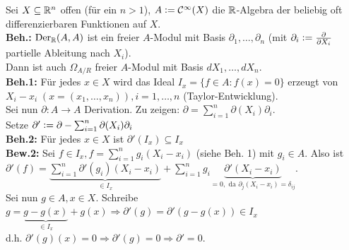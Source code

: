 \documentclass[a4paper, 10pt]{report}
\begin{document}
\begin{nnBsp}
  Sei $X \subseteq \mathbb{R}^n$ offen (für ein $n>1$), $A \mathrel{\mathop:}=
  \mathcal{C}^{\infty}(X)$ die $\mathbb{R}$-Algebra der beliebig oft
  differenzierbaren Funktionen auf $X$.\\
  \textbf{Beh.:} $\Der[{\RR}]{A}{A}$ ist ein freier $A$-Modul mit
  Basis $\partial_1, \dots , \partial_n$ (mit $\partial_i \mathrel{\mathop:}= 
  \frac{\partial}{\partial X_i}$ partielle Ableitung nach $X_i$).\\
  Dann ist auch $\Omega_{A/R}$ freier $A$-Modul mit Basis $d X_1, \dots , d
  X_n$.\\
  \textbf{Beh.1:} Für jedes $x \in X$ wird das Ideal $I_x = \{ f \in A: f(x) = 0
  \}$ erzeugt von $X_i - x_i \; (x = (x_1, \dots , x_n)), i = 1 , \dots , n$
  (Taylor-Entwicklung).\\
  Sei nun $\partial: A \to A$ Derivation. Zu zeigen: $\partial = \sum_{i = 1}^n
  \partial(X_i) \partial_i$.\\
  Setze $\partial' \mathrel{\mathop:}= \partial - \sum_{i = 1}^n \partial(X_i) \partial_i$\\
  \textbf{Beh.2:} Für jedes $x \in X$ ist $\partial'(I_x) \subseteq I_x$\\
  \textbf{Bew.2:} Sei $f \in I_x, f = \sum_{i = 1}^n g_i (X_i - x_i)$ (siehe
  Beh. 1) mit $g_i \in A$. Also ist $\partial'(f) = \underset{\in
  I_x}{\underbrace{\sum_{i = 1}^n
  \partial'(g_i)(X_i - x_i)}} + \sum_{i = 1}^n g_i \underset{=0,
  \text{ da } \partial_j(X_i-x_i)=\delta_{ij}}{\underbrace{\partial'(X_i -
  x_i)}}$.\\
  Sei nun $g \in A, x \in X$.
  Schreibe $g = \underset{\in I_x}{\underbrace{g - g(x)}} + g(x) \Rightarrow
  \partial'(g) = \partial'(g - g(x)) \in I_x$\\
  d.h. $\partial'(g)(x) = 0 \Rightarrow \partial'(g) = 0 \Rightarrow \partial' =
  0$.
\end{nnBsp}
\end{document}
